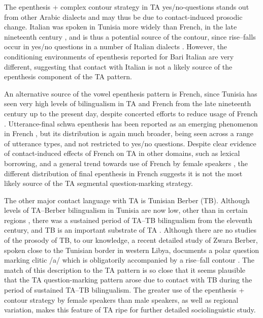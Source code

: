 \documentclass[output=paper]{langsci/langscibook}
\begin{document}
The epenthesis + complex contour strategy in TA yes/no-questions stands out from other Arabic dialects and may thus be due to contact-induced prosodic change. Italian was spoken in Tunisia more widely than French, in the late nineteenth century \citep{Sayahi2011}, and is thus a potential source of the contour, since rise--falls occur in yes/no questions in a number of Italian dialects \citep{GiliFivelaEtAl2015}. However, the conditioning environments of epenthesis reported for Bari Italian are very different, suggesting that contact with Italian is not a likely source of the epenthesis component of the TA pattern.

An alternative source of the vowel epenthesis pattern is French, since Tunisia has seen very high levels of bilingualism in TA and French from the late nineteenth century up to the present day, despite concerted efforts to reduce usage of French \citep{Daoud2007}. Utterance-final schwa epenthesis has been reported as an emerging phenomenon in French \citep{Hansen1997}, but its distribution is again much broader, being seen across a range of utterance types, and not restricted to yes/no questions. Despite clear evidence of contact-induced effects of French on TA in other domains, such as lexical borrowing, and a general trend towards use of French by female speakers \citep{Walters2011}, the different distribution of final epenthesis in French suggests it is not the most likely source of the TA segmental question-marking strategy. 

The other major contact language with TA is Tunisian Berber (TB). Although levels of TA--Berber bilingualism in Tunisia are now low, other than in certain regions \citep{Gabsi2011}, there was a sustained period of TA--TB bilingualism from the eleventh century, and TB is an important substrate of TA \citep{Daoud2007}. Although there are no studies of the prosody of TB, to our knowledge, a recent detailed study of Zwara Berber, spoken close to the Tunisian border in western Libya, documents a polar question marking clitic /a/ which is obligatorily accompanied by a rise--fall contour \citep{Gussenhoven2017}. The match of this description to the TA pattern is so close that it seems plausible that the TA question-marking pattern arose due to contact with TB during the period of sustained TA--TB bilingualism. The greater use of the epenthesis + contour strategy by female speakers than male speakers, as well as regional variation, makes this feature of TA ripe for further detailed sociolinguistic study.
\end{document}
